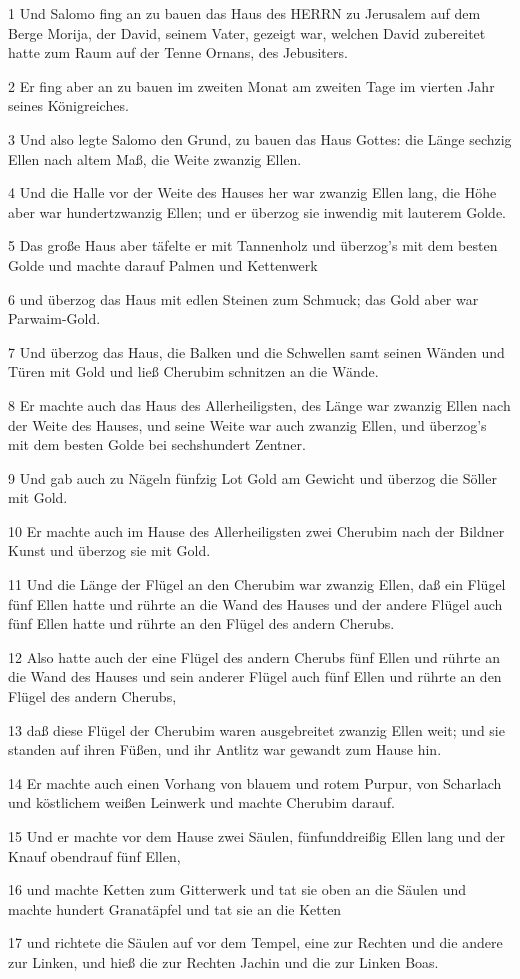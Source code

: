 \par 1 Und Salomo fing an zu bauen das Haus des HERRN zu Jerusalem auf dem Berge Morija, der David, seinem Vater, gezeigt war, welchen David zubereitet hatte zum Raum auf der Tenne Ornans, des Jebusiters.
\par 2 Er fing aber an zu bauen im zweiten Monat am zweiten Tage im vierten Jahr seines Königreiches.
\par 3 Und also legte Salomo den Grund, zu bauen das Haus Gottes: die Länge sechzig Ellen nach altem Maß, die Weite zwanzig Ellen.
\par 4 Und die Halle vor der Weite des Hauses her war zwanzig Ellen lang, die Höhe aber war hundertzwanzig Ellen; und er überzog sie inwendig mit lauterem Golde.
\par 5 Das große Haus aber täfelte er mit Tannenholz und überzog's mit dem besten Golde und machte darauf Palmen und Kettenwerk
\par 6 und überzog das Haus mit edlen Steinen zum Schmuck; das Gold aber war Parwaim-Gold.
\par 7 Und überzog das Haus, die Balken und die Schwellen samt seinen Wänden und Türen mit Gold und ließ Cherubim schnitzen an die Wände.
\par 8 Er machte auch das Haus des Allerheiligsten, des Länge war zwanzig Ellen nach der Weite des Hauses, und seine Weite war auch zwanzig Ellen, und überzog's mit dem besten Golde bei sechshundert Zentner.
\par 9 Und gab auch zu Nägeln fünfzig Lot Gold am Gewicht und überzog die Söller mit Gold.
\par 10 Er machte auch im Hause des Allerheiligsten zwei Cherubim nach der Bildner Kunst und überzog sie mit Gold.
\par 11 Und die Länge der Flügel an den Cherubim war zwanzig Ellen, daß ein Flügel fünf Ellen hatte und rührte an die Wand des Hauses und der andere Flügel auch fünf Ellen hatte und rührte an den Flügel des andern Cherubs.
\par 12 Also hatte auch der eine Flügel des andern Cherubs fünf Ellen und rührte an die Wand des Hauses und sein anderer Flügel auch fünf Ellen und rührte an den Flügel des andern Cherubs,
\par 13 daß diese Flügel der Cherubim waren ausgebreitet zwanzig Ellen weit; und sie standen auf ihren Füßen, und ihr Antlitz war gewandt zum Hause hin.
\par 14 Er machte auch einen Vorhang von blauem und rotem Purpur, von Scharlach und köstlichem weißen Leinwerk und machte Cherubim darauf.
\par 15 Und er machte vor dem Hause zwei Säulen, fünfunddreißig Ellen lang und der Knauf obendrauf fünf Ellen,
\par 16 und machte Ketten zum Gitterwerk und tat sie oben an die Säulen und machte hundert Granatäpfel und tat sie an die Ketten
\par 17 und richtete die Säulen auf vor dem Tempel, eine zur Rechten und die andere zur Linken, und hieß die zur Rechten Jachin und die zur Linken Boas.

